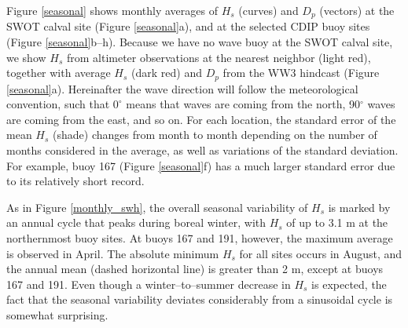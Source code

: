 Figure \ref{seasonal} shows monthly averages of $H_s$ (curves) and $D_p$ (vectors) at the SWOT calval site (Figure \ref{seasonal}a), and at the selected CDIP buoy sites (Figure \ref{seasonal}b--h). Because we have no wave buoy at the SWOT calval site, we show $H_s$ from altimeter observations at the nearest neighbor (light red), together with average $H_s$ (dark red) and $D_p$ from the WW3 hindcast (Figure \ref{seasonal}a). Hereinafter the wave direction will follow the meteorological convention, such that $0^\circ$ means that waves are coming from the north, 90$^\circ$ waves are coming from the east, and so on. 
For each location, the standard error of the mean $H_s$ (shade) changes from month to month depending on the number of months considered in the average, as well as variations of the standard deviation. For example, buoy 167 (Figure \ref{seasonal}f) has a much larger standard error due to its relatively short record.

As in Figure \ref{monthly_swh}, the overall seasonal variability of $H_s$ is marked by an annual cycle that peaks during boreal winter, with $H_s$ of up to 3.1 m at the northernmost buoy sites. At buoys 167 and 191, however, the maximum average is observed in April. The absolute minimum $H_s$ for all sites occurs in August, and the annual mean (dashed horizontal line) is greater than 2 m, except at buoys 167 and 191.
Even though a winter--to--summer decrease in $H_s$ is expected, the fact that the seasonal variability 
deviates considerably from a sinusoidal cycle is somewhat surprising.

